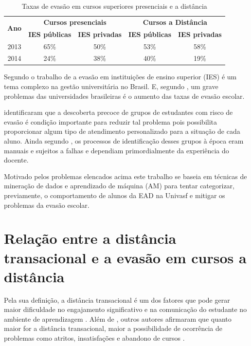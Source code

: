 \begin{table}[!htb]
  \centering
  \caption{\label{tableEvasionTax2} Taxas de evasão em cursos superiores presenciais e a distância}
  \begin{tabular}{@{}ccccc@{}}
    \toprule
    \multirow{2}{*}{\textbf{Ano}} & \multicolumn{2}{c}{\textbf{Cursos presenciais}} & \multicolumn{2}{c}{\textbf{Cursos a Distância}} \\ \cmidrule(l){2-5}
    & \textbf{IES públicas} & \textbf{IES privadas} & \textbf{IES públicas} & \textbf{IES privadas} \\ \midrule
    2013 & 65\% & 50\% & 53\% & 58\% \\
    2014 & 24\% & 38\% & 40\% & 19\% \\ \bottomrule
  \end{tabular}
\end{table}

Segundo o trabalho de  a
evasão em instituições de ensino superior (IES) é um tema complexo na gestão
universitária no Brasil. E, segundo
, um grave problemas das
universidades brasileiras é o aumento das taxas de evasão escolar.

 identificaram que a descoberta precoce de
grupos de estudantes com risco de evasão é condição importante para reduzir tal
problema pois possibilita proporcionar algum tipo de atendimento personalizado
para a situação de cada aluno. Ainda segundo
, os processos de identificação desses
grupos à época eram manuais e sujeitos a falhas e dependiam primordialmente da
experiência do docente.

Motivado pelos problemas elencados acima este trabalho se baseia em técnicas de
mineração de dados e aprendizado de máquina (AM) para tentar categorizar,
previamente, o comportamento de alunos da EAD na Univasf e mitigar os problemas
da evasão escolar.

\section{Relação entre a distância transacional e a evasão em cursos a distância}

Pela sua definição, a distância transacional é um dos fatores que pode gerar
maior dificuldade no engajamento significativo e na comunicação do estudante no
ambiente de aprendizagem \cite{goel2012transactional}. Além de
, outros autores afirmaram que quanto maior for a
distância transacional, maior a possibilidade de ocorrência de problemas como
atritos, insatisfações e abandono de cursos
\cite{zhang2003transactional,steinman2007educational,horzum2011developing,
mbwesa2014transactional,paul2015revisiting}.

